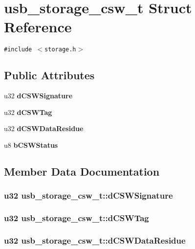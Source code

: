 \section{usb\_\-storage\_\-csw\_\-t Struct Reference}
\label{structusb__storage__csw__t}
{\tt \#include $<$storage.h$>$}

\subsection*{Public Attributes}
\begin{CompactItemize}
\item 
u32 {\bf d\-CSWSignature}
\item 
u32 {\bf d\-CSWTag}
\item 
u32 {\bf d\-CSWData\-Residue}
\item 
u8 {\bf b\-CSWStatus}
\end{CompactItemize}


\subsection{Member Data Documentation}
\subsubsection{\setlength{\rightskip}{0pt plus 5cm}u32 {\bf usb\_\-storage\_\-csw\_\-t::d\-CSWSignature}}\label{structusb__storage__csw__t_7650509b5265eca7c68ce06dd0bded17}


\subsubsection{\setlength{\rightskip}{0pt plus 5cm}u32 {\bf usb\_\-storage\_\-csw\_\-t::d\-CSWTag}}\label{structusb__storage__csw__t_40746de282fab1ebfda5e7b93eb1ed9e}


\subsubsection{\setlength{\rightskip}{0pt plus 5cm}u32 {\bf usb\_\-storage\_\-csw\_\-t::d\-CSWData\-Residue}}\label{structusb__storage__csw__t_d475590bd8f69d6fe8c9ad9e270af68b}


